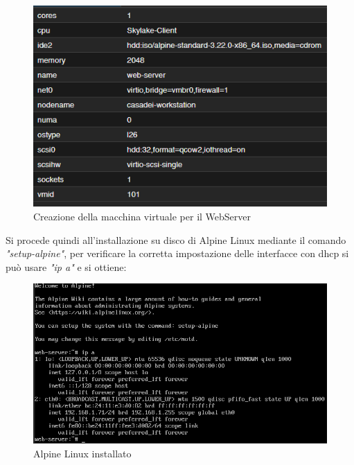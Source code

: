 \documentclass[a4paper]{article}
\begin{document}
\begin{figure}[H]
    \centering
    \includegraphics[scale=0.9]{images/VMWebServer.png}
    \caption{Creazione della macchina virtuale per il WebServer}
\end{figure}

Si procede quindi all'installazione su disco di Alpine Linux mediante il comando \textit{"setup-alpine"},
per verificare la corretta impostazione delle interfacce con dhcp si può usare \textit{"ip a"} 
e si ottiene:
\begin{figure}[H]
    \centering
    \includegraphics[scale=0.6]{images/AlpineInstallato.png}
    \caption{Alpine Linux installato}
\end{figure}
\end{document}
